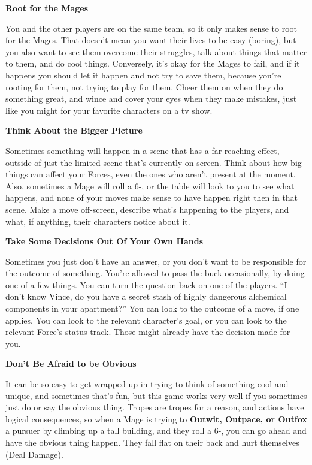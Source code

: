 \documentclass[
  oneside,
  statementpaper,
  9pt]{memoir}
\begin{document}
\textbf{Root for the Mages}

You and the other players are on the same team, so it only makes sense
to root for the Mages. That doesn't mean you want their lives to be easy
(boring), but you also want to see them overcome their struggles, talk
about things that matter to them, and do cool things. Conversely, it's
okay for the Mages to fail, and if it happens you should let it happen
and not try to save them, because you're rooting for them, not trying to
play for them. Cheer them on when they do something great, and wince and
cover your eyes when they make mistakes, just like you might for your
favorite characters on a tv show.

\textbf{Think About the Bigger Picture}

Sometimes something will happen in a scene that has a far-reaching
effect, outside of just the limited scene that's currently on screen.
Think about how big things can affect your Forces, even the ones who
aren't present at the moment. Also, sometimes a Mage will roll a 6-, or
the table will look to you to see what happens, and none of your moves
make sense to have happen right then in that scene. Make a move
off-screen, describe what's happening to the players, and what, if
anything, their characters notice about it.

\textbf{Take Some Decisions Out Of Your Own Hands}

Sometimes you just don't have an answer, or you don't want to be
responsible for the outcome of something. You're allowed to pass the
buck occasionally, by doing one of a few things. You can turn the
question back on one of the players. ``I don't know Vince, do you have a
secret stash of highly dangerous alchemical components in your
apartment?'' You can look to the outcome of a move, if one applies. You
can look to the relevant character's goal, or you can look to the
relevant Force's status track. Those might already have the decision
made for you.

\textbf{Don't Be Afraid to be Obvious}

It can be so easy to get wrapped up in trying to think of something cool
and unique, and sometimes that's fun, but this game works very well if
you sometimes just do or say the obvious thing. Tropes are tropes for a
reason, and actions have logical consequences, so when a Mage is trying
to \textbf{Outwit, Outpace, or Outfox} a pursuer by climbing up a tall
building, and they roll a 6-, you can go ahead and have the obvious
thing happen. They fall flat on their back and hurt themselves (Deal
Damage).
\end{document}
